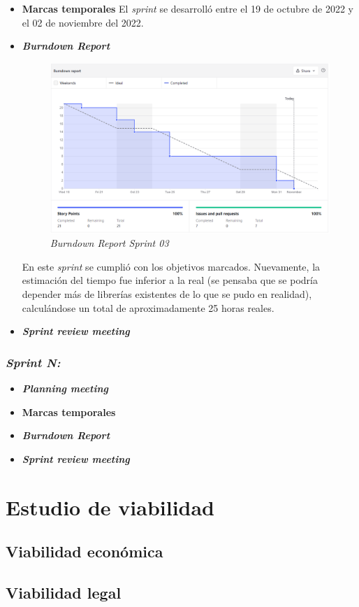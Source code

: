 \begin{itemize}
\begin{enumerate}
	\end{enumerate}
	
	\item \textbf{Marcas temporales}	
	El \textit{sprint} se desarrolló entre el 19 de octubre de 2022 y el 02 de noviembre del 2022.
	
	\item \textbf{\textit{Burndown Report}}
	
		\begin{figure}[h]
		\caption{\textit{Burndown Report Sprint 03}}
		\centering
		\includegraphics[width=\textwidth]{../img/anexos/s03_bdr}
		\end{figure}
	
	En este \textit{sprint} se cumplió con los objetivos marcados. Nuevamente, la estimación del tiempo fue inferior a la real (se pensaba que se podría depender más de librerías existentes de lo que se pudo en realidad), calculándose un total de aproximadamente 25 horas reales.
	
	
	\item \textbf{\textit{Sprint review meeting}}
\end{itemize}







\subsubsection{\textit{Sprint N:}}
\begin{itemize}
	\item \textbf{\textit{Planning meeting}}
	\item \textbf{Marcas temporales}		
	\item \textbf{\textit{Burndown Report}}
	\item \textbf{\textit{Sprint review meeting}}
\end{itemize}

\section{Estudio de viabilidad}

\subsection{Viabilidad económica}

\subsection{Viabilidad legal}


